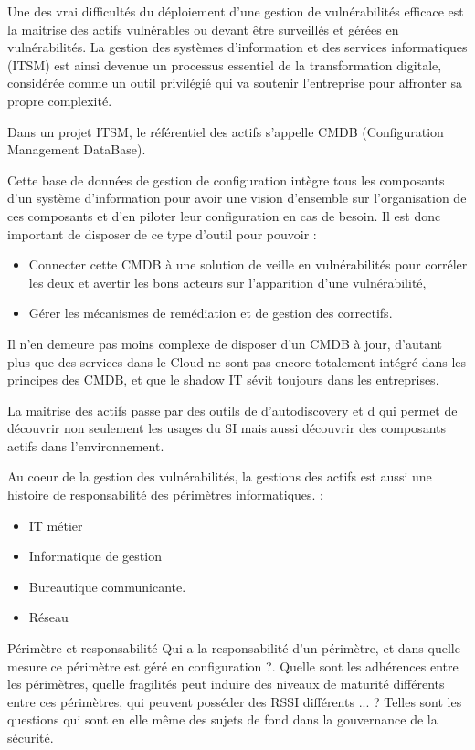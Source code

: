 Une des vrai difficultés du déploiement d'une gestion de vulnérabilités efficace est la maitrise des actifs vulnérables ou devant être surveillés et gérées en vulnérabilités.
La gestion des systèmes d'information et des services informatiques (ITSM) est ainsi devenue un processus essentiel de la transformation digitale, considérée comme un outil privilégié qui va soutenir l’entreprise pour affronter sa propre complexité.

Dans un projet ITSM, le référentiel des actifs s’appelle CMDB (Configuration Management DataBase).

Cette base de données de gestion de configuration intègre  tous les composants d’un système d'information pour  avoir une vision d’ensemble sur l’organisation de ces composants et d’en piloter leur configuration en cas de besoin.
Il est donc important de disposer de ce type d'outil pour pouvoir :

\begin{itemize}
  \item Connecter cette CMDB à une solution de veille en vulnérabilités pour corréler les deux et avertir les bons acteurs sur l'apparition d'une vulnérabilité,
\item Gérer les mécanismes de remédiation et de gestion des correctifs.
\end{itemize}

Il n'en demeure pas moins complexe de disposer d'un CMDB à jour, d'autant plus que des services dans le Cloud ne sont pas encore totalement intégré dans les principes des CMDB, et que le shadow IT  sévit toujours dans les entreprises.

La maitrise des actifs passe par des outils de d'autodiscovery et d qui permet de découvrir non seulement les usages du SI mais aussi découvrir des composants actifs dans l'environnement.

Au coeur de la gestion des vulnérabilités, la gestions des actifs est aussi une histoire de responsabilité des périmètres  informatiques. :

\begin{itemize}
  \item IT métier
  \item Informatique de gestion
  \item Bureautique communicante.
  \item Réseau
\end{itemize}



\begin{techworkbox}{Périmètre et responsabilité}
Qui a la responsabilité d'un périmètre, et dans quelle mesure ce périmètre est géré en configuration ?. Quelle sont les adhérences entre les périmètres, quelle fragilités peut induire des niveaux de maturité différents entre ces périmètres, qui peuvent posséder des RSSI différents ... ? Telles sont les questions qui sont en elle même des sujets de fond dans la gouvernance de la sécurité.
\end{techworkbox}


